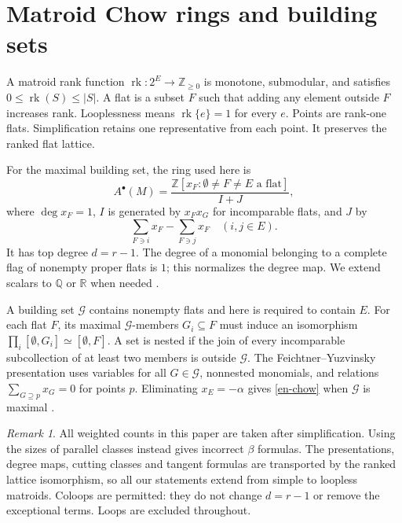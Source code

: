 \documentclass[12pt]{amsart}
\theoremstyle{definition}
\theoremstyle{remark}
\newtheorem{rem}[thm]{Remark}
\numberwithin{equation}{section}
\newcommand{\rk}{\operatorname{rk}}
\newcommand{\R}{\mathbb{R}}
\newcommand{\Z}{\mathbb{Z}}
\newcommand{\Q}{\mathbb{Q}}
\begin{document}
\section{Matroid Chow rings and building sets}
A matroid rank function $\rk:2^E\to\Z_{\geq0}$ is monotone, submodular, and satisfies $0\leq\rk(S)\leq|S|$. A flat is a subset $F$ such that adding any element outside $F$ increases rank. Looplessness means $\rk\{e\}=1$ for every $e$. Points are rank-one flats. Simplification retains one representative from each point. It preserves the ranked flat lattice.

For the maximal building set, the ring used here is
\begin{equation}\label{en-chow}
 A^\bullet(M)=\frac{\Z[x_F:\emptyset\ne F\ne E\text{ a flat}]}{I+J},
\end{equation}
where $\deg x_F=1$, $I$ is generated by $x_Fx_G$ for incomparable flats, and $J$ by
\[
 \sum_{F\ni i}x_F-\sum_{F\ni j}x_F\quad(i,j\in E).
\]
It has top degree $d=r-1$. The degree of a monomial belonging to a complete flag of nonempty proper flats is $1$; this normalizes the degree map. We extend scalars to $\Q$ or $\R$ when needed \cite{FY,AHK}.

A building set $\mathcal G$ contains nonempty flats and here is required to contain $E$. For each flat $F$, its maximal $\mathcal G$-members $G_i\subseteq F$ must induce an isomorphism $\prod_i[\emptyset,G_i]\simeq[\emptyset,F]$. A set is nested if the join of every incomparable subcollection of at least two members is outside $\mathcal G$. The Feichtner--Yuzvinsky presentation uses variables for all $G\in\mathcal G$, nonnested monomials, and relations $\sum_{G\supseteq p}x_G=0$ for points $p$. Eliminating $x_E=-\alpha$ gives \eqref{en-chow} when $\mathcal G$ is maximal \cite[Definitions 1--3]{FY}.

\begin{rem}
All weighted counts in this paper are taken after simplification. Using the sizes of parallel classes instead gives incorrect $\beta$ formulas. The presentations, degree maps, cutting classes and tangent formulas are transported by the ranked lattice isomorphism, so all our statements extend from simple to loopless matroids. Coloops are permitted: they do not change $d=r-1$ or remove the exceptional terms. Loops are excluded throughout.
\end{rem}
\end{document}
